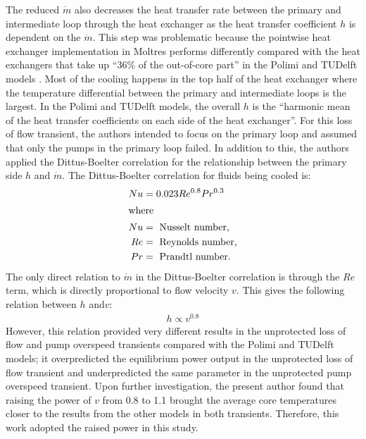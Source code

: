 The reduced $\dot{m}$ also decreases the heat transfer rate between the
primary and intermediate loop through the heat exchanger as the heat transfer
coefficient $h$ is dependent on the $\dot{m}$. This step was problematic
because
the pointwise heat exchanger implementation in Moltres performs differently
compared with the heat exchangers that take up ``36\% of the out-of-core
part'' in the Polimi and TUDelft models \cite{fiorina_modelling_2014}. Most of
the cooling happens in the top half of the heat exchanger where the
temperature differential between the primary and intermediate loops is the
largest. In the Polimi and TUDelft models, the overall $h$ is the
``harmonic mean of the heat transfer coefficients on each side of the heat
exchanger''. For this loss of flow transient, the authors intended to focus on
the primary loop and assumed that only the pumps in the primary loop failed.
In addition to this, the authors applied the Dittus-Boelter correlation
\cite{dittus_heat_1930} for the relationship between the primary side $h$ and
$\dot{m}$. The Dittus-Boelter correlation for fluids being cooled is:
%
\begin{align}
    Nu &= 0.023 Re^{0.8} Pr^{0.3} \label{eq:db} \\
    \intertext{where}
    Nu &= \text{ Nusselt number,} \nonumber \\
    Re &= \text{ Reynolds number,} \nonumber \\
    Pr &= \text{ Prandtl number.} \nonumber
\end{align}
%
The only direct relation to $\dot{m}$ in the Dittus-Boelter correlation is
through the $Re$ term, which is directly proportional to flow velocity $v$.
This gives the following relation between $h$ and$v$:
%
\begin{align}
    h \propto v^{0.8} \label{eq:hv}
\end{align}
%
However, this relation provided very different results in the unprotected loss
of flow and pump overspeed transients compared with the Polimi and TUDelft
models; it overpredicted the equilibrium power output in the
unprotected loss of flow transient and underpredicted the same parameter in
the unprotected pump overspeed transient. Upon further investigation, the
present author found that raising the power of $v$ from 0.8 to 1.1 brought the
average core temperatures closer to the results from the other models in both
transients. Therefore, this work adopted the raised power in this study.

